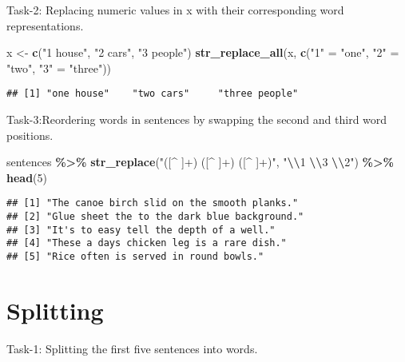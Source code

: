 \documentclass[
]{article}
\newenvironment{Shaded}{\begin{snugshade}}{\end{snugshade}}
\newcommand{\DecValTok}[1]{\textcolor[rgb]{0.00,0.00,0.81}{#1}}
\newcommand{\FunctionTok}[1]{\textcolor[rgb]{0.13,0.29,0.53}{\textbf{#1}}}
\newcommand{\NormalTok}[1]{#1}
\newcommand{\OtherTok}[1]{\textcolor[rgb]{0.56,0.35,0.01}{#1}}
\newcommand{\SpecialCharTok}[1]{\textcolor[rgb]{0.81,0.36,0.00}{\textbf{#1}}}
\newcommand{\StringTok}[1]{\textcolor[rgb]{0.31,0.60,0.02}{#1}}
\begin{document}
Task-2: Replacing numeric values in x with their corresponding word
representations.

\begin{Shaded}
\begin{Highlighting}[]
\NormalTok{x }\OtherTok{\textless{}{-}} \FunctionTok{c}\NormalTok{(}\StringTok{"1 house"}\NormalTok{, }\StringTok{"2 cars"}\NormalTok{, }\StringTok{"3 people"}\NormalTok{)}
\FunctionTok{str\_replace\_all}\NormalTok{(x, }\FunctionTok{c}\NormalTok{(}\StringTok{"1"} \OtherTok{=} \StringTok{"one"}\NormalTok{, }\StringTok{"2"} \OtherTok{=} \StringTok{"two"}\NormalTok{, }\StringTok{"3"} \OtherTok{=} \StringTok{"three"}\NormalTok{))}
\end{Highlighting}
\end{Shaded}

\begin{verbatim}
## [1] "one house"    "two cars"     "three people"
\end{verbatim}

Task-3:Reordering words in sentences by swapping the second and third
word positions.

\begin{Shaded}
\begin{Highlighting}[]
\NormalTok{sentences }\SpecialCharTok{\%\textgreater{}\%} 
  \FunctionTok{str\_replace}\NormalTok{(}\StringTok{"([\^{} ]+) ([\^{} ]+) ([\^{} ]+)"}\NormalTok{, }\StringTok{"}\SpecialCharTok{\textbackslash{}\textbackslash{}}\StringTok{1 }\SpecialCharTok{\textbackslash{}\textbackslash{}}\StringTok{3 }\SpecialCharTok{\textbackslash{}\textbackslash{}}\StringTok{2"}\NormalTok{) }\SpecialCharTok{\%\textgreater{}\%} 
  \FunctionTok{head}\NormalTok{(}\DecValTok{5}\NormalTok{)}
\end{Highlighting}
\end{Shaded}

\begin{verbatim}
## [1] "The canoe birch slid on the smooth planks." 
## [2] "Glue sheet the to the dark blue background."
## [3] "It's to easy tell the depth of a well."     
## [4] "These a days chicken leg is a rare dish."   
## [5] "Rice often is served in round bowls."
\end{verbatim}

\hypertarget{splitting}{%
\section{Splitting}\label{splitting}}

Task-1: Splitting the first five sentences into words.
\end{document}
